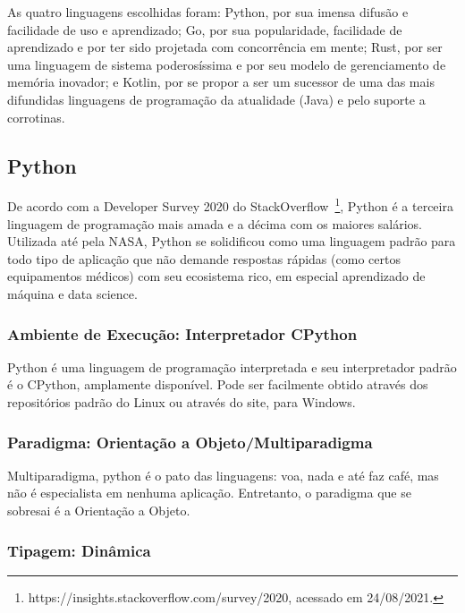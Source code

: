 \documentclass{article}
\begin{document}
As quatro linguagens escolhidas foram: Python, por sua imensa difusão e facilidade de uso e aprendizado; Go, por sua popularidade, facilidade de aprendizado e por ter sido projetada com concorrência em mente; Rust, por ser uma linguagem de sistema poderosíssima e por seu modelo de gerenciamento de memória inovador; e Kotlin, por se propor a ser um sucessor de uma das mais difundidas linguagens de programação da atualidade (Java) e pelo suporte a corrotinas.

\subsection{Python}
\label{ssec:python}

De acordo com a Developer Survey 2020 do StackOverflow~\footnote{\label{foot:fn1} https://insights.stackoverflow.com/survey/2020, acessado em 24/08/2021.}, Python é a terceira linguagem de programação mais amada e a décima com os maiores salários. Utilizada até pela NASA, Python se solidificou como uma linguagem padrão para todo tipo de aplicação que não demande respostas rápidas (como certos equipamentos médicos) com seu ecosistema rico, em especial aprendizado de máquina e data science.

\subsubsection{Ambiente de Execução: Interpretador CPython}
\label{sssec:python ambiente execucao}

Python é uma linguagem de programação interpretada e seu interpretador padrão é o CPython, amplamente disponível. Pode ser facilmente obtido através dos repositórios padrão do Linux ou através do site, para Windows.

\subsubsection{Paradigma: Orientação a Objeto/Multiparadigma}
\label{sssec:python paradigma}

Multiparadigma, python é o pato das linguagens: voa, nada e até faz café, mas não é especialista em nenhuma aplicação. Entretanto, o paradigma que se sobresai é a Orientação a Objeto.

\subsubsection{Tipagem: Dinâmica}
\label{sssec:python tipagem}
\end{document}
